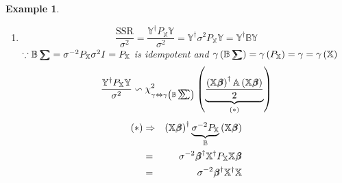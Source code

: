 \documentclass{article}
\newtheorem{example}[theorem]{Example}
\begin{document}
\begin{example}
\begin{enumerate}
\item 
\begin{equation*}
\frac{\text{SSR}}{\sigma ^{2}}=\frac{\mathbb{Y}^{\dagger }P_{\mathbb{X}}%
\mathbb{Y}}{\sigma ^{2}}=\mathbb{Y}^{\dagger }\sigma ^{2}P_{\mathbb{X}}%
\mathbb{Y=Y}^{\dagger }\mathbb{BY}
\end{equation*}%
$\because \mathbb{B}%
\tsum\mkern-20mu\tsum%
=\sigma ^{-2}P_{\mathbb{X}}\sigma ^{2}I=P_{\mathbb{X}}$ is idempotent and $%
\gamma \left( \mathbb{B}%
\tsum\mkern-20mu\tsum%
\right) =\gamma \left( P_{\mathbb{X}}\right) =\gamma =\gamma \left( \mathbb{X%
}\right) $%
\begin{equation*}
\therefore \frac{\mathbb{Y}^{\dagger }P_{\mathbb{X}}\mathbb{Y}}{\sigma ^{2}}%
\backsim \chi _{\gamma \Leftrightarrow \gamma \left( \mathbb{B}%
\tsum\mkern-20mu\tsum%
\right) }^{2}\left( \underset{\left( \ast \right) }{\underbrace{\frac{\left( 
\mathbb{X}%
\beta\mkern-9.6mu \beta%
\right) ^{\dagger }\mathbb{A}\left( \mathbb{X}%
\beta\mkern-9.6mu \beta%
\right) }{2}}}\right)
\end{equation*}%
\begin{eqnarray*}
\left( \ast \right) &\Rightarrow &\left( \mathbb{X}%
\beta\mkern-9.6mu \beta%
\right) ^{\dagger }\underset{\mathbb{B}}{\underbrace{\sigma ^{-2}P_{\mathbb{X%
}}}}\left( \mathbb{X}%
\beta\mkern-9.6mu \beta%
\right) \\
&=&\sigma ^{-2}%
\beta\mkern-9.6mu \beta%
^{\dagger }\mathbb{X}^{\dagger }P_{\mathbb{X}}\mathbb{X}%
\beta\mkern-9.6mu \beta
\\
&=&\sigma ^{-2}%
\beta\mkern-9.6mu \beta%
^{\dagger }\mathbb{X}^{\dagger }\mathbb{X}%

\end{eqnarray*}
\end{enumerate}
\end{example}
\end{document}
